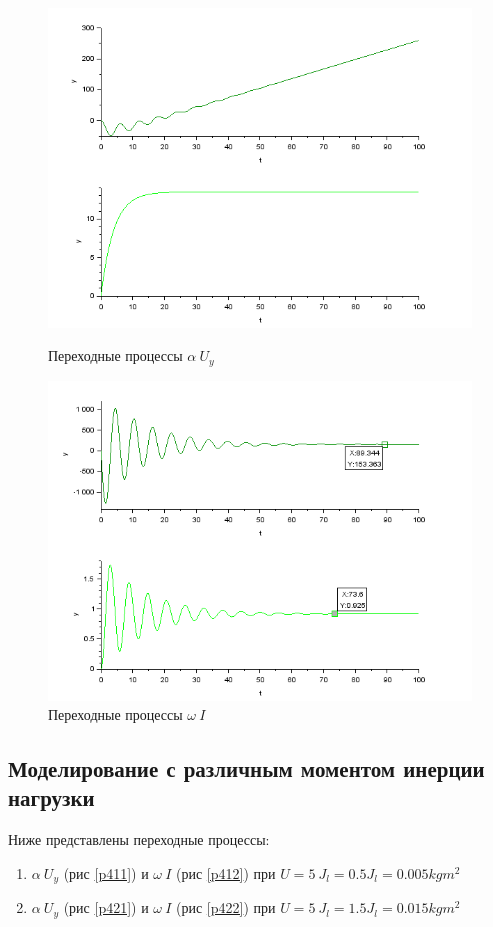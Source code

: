 \documentclass[a4paper,12pt,russian]{article} %
\begin{document}
\begin{figure}[H]
	\includegraphics[width=\linewidth]{321.png}
	\caption{Переходные процессы $\alpha\:  U_y$}\label{p321}
	\endminipage\hfill
	\includegraphics[width=\linewidth]{322.png}
	\caption{Переходные процессы $\omega\:  I$}\label{p322}
	\endminipage
\end{figure}

\subsection{Моделирование с различным моментом инерции нагрузки}
Ниже представлены переходные процессы:\\
\begin{enumerate}
	\item  $\alpha\:  U_y$ (рис \ref{p411}) и $\omega\:  I$ (рис \ref{p412})  при  $U=5\: J_l=0.5J_l=0.005kgm^2$
	\item  $\alpha\:  U_y$ (рис \ref{p421}) и $\omega\:  I$ (рис \ref{p422})  при  $U=5\: J_l=1.5J_l=0.015kgm^2$
\end{enumerate} 
\end{document}
